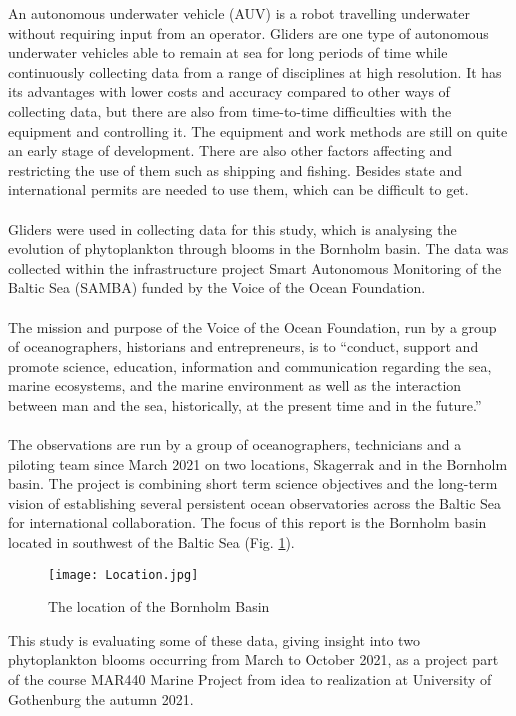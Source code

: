 \documentclass[../Main.tex]{subfiles}
\begin{document}
An autonomous underwater vehicle (AUV) is a robot travelling underwater without requiring input from an operator.
Gliders are one type of autonomous underwater vehicles able to remain at sea for long periods of time while continuously collecting data from a range of disciplines at high resolution. 
It has its advantages with lower costs and accuracy compared to other ways of collecting data, but there are also from time-to-time difficulties with the equipment and controlling it. 
The equipment and work methods are still on quite an early stage of development. 
There are also other factors affecting and restricting the use of them such as shipping and fishing. 
Besides state and international permits are needed to use them, which can be difficult to get. 
\ \\ \ \\
Gliders were used in collecting data for this study, which is analysing the evolution of phytoplankton through blooms in the Bornholm basin. 
The data was collected within the infrastructure project Smart Autonomous Monitoring of the Baltic Sea (SAMBA) funded by the Voice of the Ocean Foundation.
\ \\ \ \\
The mission and purpose of the Voice of the Ocean Foundation, run by a group of oceanographers, historians and entrepreneurs, is to “conduct, support and promote science, education, information and communication regarding the sea, marine ecosystems, and the marine environment as well as the interaction between man and the sea, historically, at the present time and in the future.”\supercite{VOTO2021} 
\ \\ \ \\
The observations are run by a group of oceanographers, technicians and a piloting team since March 2021 on two locations, Skagerrak and in the Bornholm basin. 
The project is combining short term science objectives and the long-term vision of establishing several persistent ocean observatories across the Baltic Sea for international collaboration.
The focus of this report is the Bornholm basin located in southwest of the Baltic Sea (Fig. \ref{fig:loc}).
\begin{figure}[H]
\texttt{[image: Location.jpg]}
\caption{The location of the Bornholm Basin}
\label{fig:loc}
\end{figure}
This study is evaluating some of these data, giving insight into two phytoplankton blooms occurring from March to October 2021, as a project part of the course MAR440 Marine Project from idea to realization at University of Gothenburg the autumn 2021.
\end{document}
